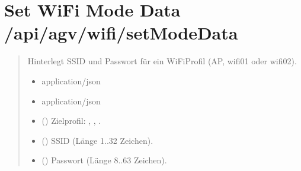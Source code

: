 \documentclass[letterpaper,10pt,english]{sphinxmanual}
\begin{document}
\section{Set WiFi Mode Data \textendash{} /api/agv/wifi/setModeData}
\label{\detokenize{agv_rest_api_wifi:set-wifi-mode-data-api-agv-wifi-setmodedata}}\label{\detokenize{agv_rest_api_wifi:post-api-agv-wifi-setmodedata}}

\begin{fulllineitems}
\label{\detokenize{agv_rest_api_wifi:post--api-agv-wifi-setModeData}}
\pysigstartsignatures
\pysigline
{}
\pysigstopsignatures\begin{quote}\begin{description}
\sphinxAtStartPar
Hinterlegt SSID und Passwort für ein WiFi\sphinxhyphen{}Profil (AP, wifi\sphinxhyphen{}01 oder wifi\sphinxhyphen{}02).

\begin{itemize}
\item {} 
\sphinxAtStartPar
{} \textendash{} application/json

\end{itemize}

\begin{itemize}
\item {} 
\sphinxAtStartPar
{} \textendash{} application/json

\end{itemize}

\begin{itemize}
\item {} 
\sphinxAtStartPar
{} () \textendash{} Zielprofil: , , .

\item {} 
\sphinxAtStartPar
{} () \textendash{} SSID (Länge 1..32 Zeichen).

\item {} 
\sphinxAtStartPar
{} () \textendash{} Passwort (Länge 8..63 Zeichen).


\end{itemize}
\end{description}
\end{quote}
\end{fulllineitems}
\end{document}
